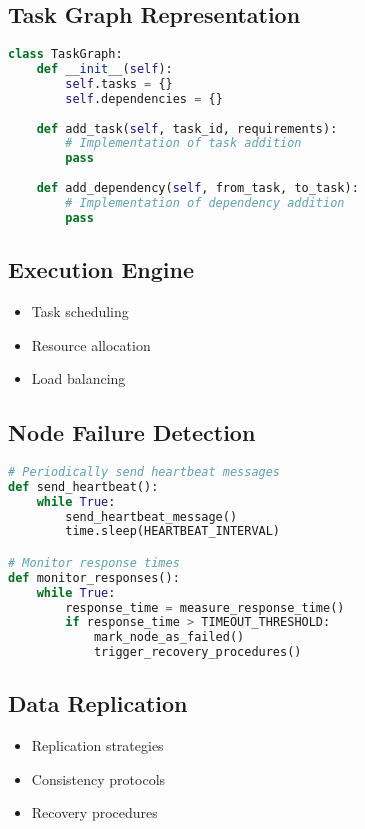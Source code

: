 \subsection{Task Graph Representation}
\begin{lstlisting}[language=Python]
class TaskGraph:
    def __init__(self):
        self.tasks = {}
        self.dependencies = {}
    
    def add_task(self, task_id, requirements):
        # Implementation of task addition
        pass
    
    def add_dependency(self, from_task, to_task):
        # Implementation of dependency addition
        pass
\end{lstlisting}

\subsection{Execution Engine}
\begin{itemize}
    \item Task scheduling
    \item Resource allocation
    \item Load balancing
\end{itemize}

\subsection{Node Failure Detection}
\begin{lstlisting}[language=Python,caption=Node Failure Detection]
# Periodically send heartbeat messages
def send_heartbeat():
    while True:
        send_heartbeat_message()
        time.sleep(HEARTBEAT_INTERVAL)

# Monitor response times
def monitor_responses():
    while True:
        response_time = measure_response_time()
        if response_time > TIMEOUT_THRESHOLD:
            mark_node_as_failed()
            trigger_recovery_procedures()
\end{lstlisting}

\subsection{Data Replication}
\begin{itemize}
    \item Replication strategies
    \item Consistency protocols
    \item Recovery procedures
\end{itemize}

